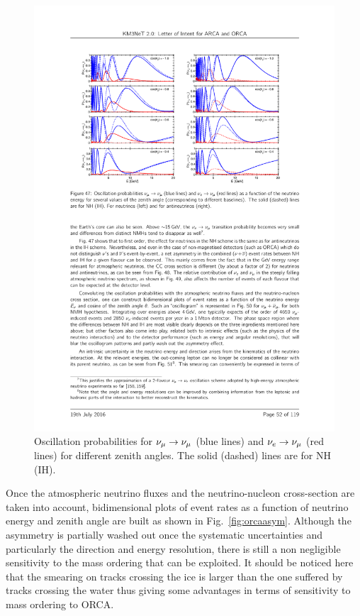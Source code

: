\begin{figure} [h!]
\begin{center}
\includegraphics[width=12cm]{figures/orca_oscprob.pdf}
\caption{\label{fig:orcaoscprob} Oscillation probabilities for $\nu_\mu \rightarrow \nu_\mu$ (blue lines)  and $\nu_e \rightarrow \nu_\mu$ (red lines) for different zenith angles. The solid (dashed) lines are for NH (IH).}
\end{center}
\end{figure}

Once the atmospheric neutrino fluxes and the neutrino-nucleon cross-section are taken into account, bidimensional plots of event rates as a function of neutrino energy and zenith angle are built as shown in Fig.~\ref{fig:orcaasym}. Although the asymmetry is partially washed out once the systematic uncertainties and particularly the direction and energy resolution, there is still a non negligible sensitivity to the mass ordering that can be exploited. It should be noticed here that the smearing on tracks crossing the ice is larger than the one suffered by tracks crossing the water thus giving some advantages in terms of sensitivity to mass ordering to ORCA.

